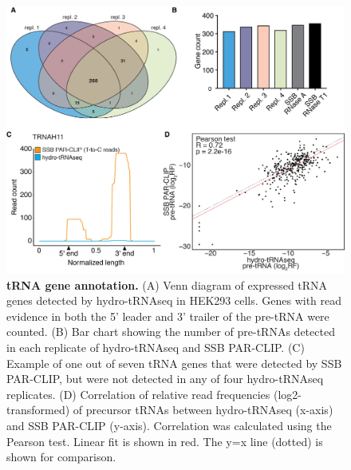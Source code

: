\documentclass[12pt]{rockefeller}
\begin{document}
\begin{figure}[!h]%
\centering
\includegraphics[width=\textwidth]{paper3.png}%
\caption[tRNA gene annotation.]
{\textbf{tRNA gene annotation.}
(A) Venn diagram of expressed tRNA genes detected by hydro-tRNAseq in HEK293 cells. Genes with read evidence in both the 5’ leader and 3’ trailer of the pre-tRNA were counted. (B) Bar chart showing the number of pre-tRNAs detected in each replicate of hydro-tRNAseq and SSB PAR-CLIP. (C) Example of one out of seven tRNA genes that were detected by SSB PAR-CLIP, but were not detected in any of four hydro-tRNAseq replicates. (D) Correlation of relative read frequencies (log2-transformed) of precursor tRNAs between hydro-tRNAseq (x-axis) and SSB PAR-CLIP (y-axis). Correlation was calculated using the Pearson test. Linear fit is shown in red. The y=x line (dotted) is shown for comparison.}
\centering
\label{paper3}%
\end{figure}
\end{document}
